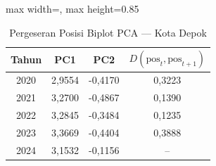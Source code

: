 \begin{table}[H]
\centering
\caption{Pergeseran Posisi Biplot PCA --- Kota Depok} \label{tab:appjarak_pca_skor_kota_depok}
\begin{adjustbox}{max width=\textwidth, max height=0.85\textheight}
\begin{tabular}{|c|c|c|c|}
\hline
\textbf{Tahun} & \textbf{PC1} & \textbf{PC2} & \textbf{$D(\text{pos}_t, \text{pos}_{t+1})$} \\
\hline
2020 & 2,9554 & -0,4170 & 0,3223 \\
2021 & 3,2700 & -0,4867 & 0,1390 \\
2022 & 3,2845 & -0,3484 & 0,1235 \\
2023 & 3,3669 & -0,4404 & 0,3888 \\
2024 & 3,1532 & -0,1156 & -- \\
\hline
\end{tabular}
\end{adjustbox}
\end{table}
